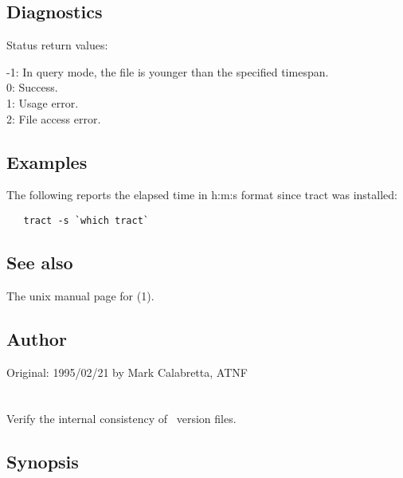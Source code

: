 \subsection*{Diagnostics}

Status return values:
\begin{status}
  -1:  In query mode, the file is younger than the specified timespan.\\
   0:  Success.\\
   1:  Usage error.\\
   2:  File access error.
\end{status}

\subsection*{Examples}

The following reports the elapsed time in h:m:s format since tract was
installed:

\begin{verbatim}
   tract -s `which tract`
\end{verbatim}

\subsection*{See also}

The unix manual page for (1).

\subsection*{Author}

Original: 1995/02/21 by Mark Calabretta, ATNF


\newpage
\section{}
\label{xrcs}

Verify the internal consistency of \rcs\ version files.

\subsection*{Synopsis}

\begin{synopsis}
\end{synopsis}

